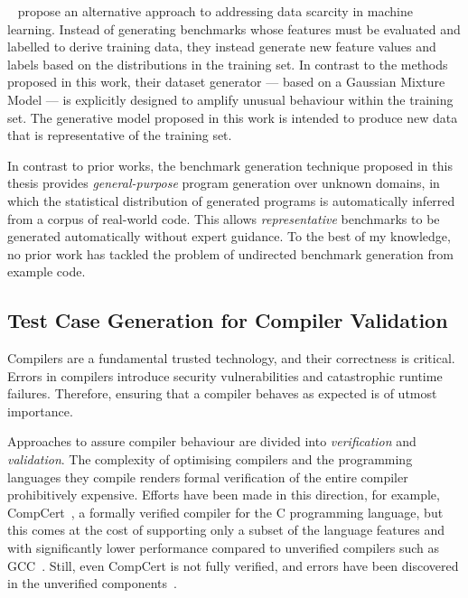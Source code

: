 \citeauthor{Ding2019}~\cite{Ding2019} propose an alternative approach to addressing data scarcity in machine learning. Instead of generating benchmarks whose features must be evaluated and labelled to derive training data, they instead generate new feature values and labels based on the distributions in the training set. In contrast to the methods proposed in this work, their dataset generator --- based on a Gaussian Mixture Model --- is explicitly designed to amplify unusual behaviour within the training set. The generative model proposed in this work is intended to produce new data that is representative of the training set.

In contrast to prior works, the benchmark generation technique proposed in this thesis provides \emph{general-purpose} program generation over unknown domains, in which the statistical distribution of generated programs is automatically inferred from a corpus of real-world code. This allows \emph{representative} benchmarks to be generated automatically without expert guidance. To the best of my knowledge, no prior work has tackled the problem of undirected benchmark generation from example code.


\subsection{Test Case Generation for Compiler Validation}

Compilers are a fundamental trusted technology, and their correctness is critical. Errors in compilers introduce security vulnerabilities and catastrophic runtime failures. Therefore, ensuring that a compiler behaves as expected is of utmost importance.

Approaches to assure compiler behaviour are divided into \emph{verification} and \emph{validation}. The complexity of optimising compilers and the programming languages they compile renders formal verification of the entire compiler prohibitively expensive. Efforts have been made in this direction, for example, CompCert~\cite{Leroy2013}, a formally verified compiler for the C programming language, but this comes at the cost of supporting only a subset of the language features and with significantly lower performance compared to unverified compilers such as GCC~\cite{Daniel2017}. Still, even CompCert is not fully verified, and errors have been discovered in the unverified components~\cite{Yang2011}.


